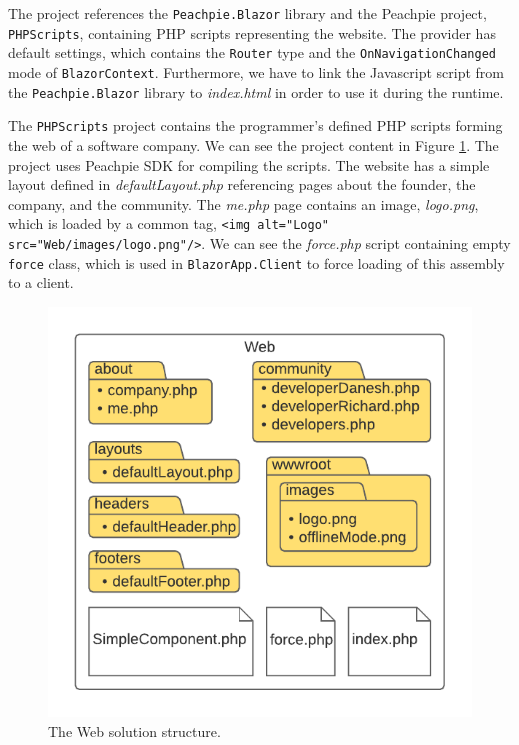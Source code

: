 \par
The project references the \texttt{Peachpie.Blazor} library and the Peachpie project, \texttt{PHPScripts}, containing PHP scripts representing the website.
The provider has default settings, which contains the \texttt{Router} type and the \texttt{OnNavigationChanged} mode of \texttt{BlazorContext}.
Furthermore, we have to link the Javascript script from the \texttt{Peachpie.Blazor} library to \textit{index.html} in order to use it during the runtime.
\par
The \texttt{PHPScripts} project contains the programmer's defined PHP scripts forming the web of a software company.
We can see the project content in Figure \ref{img22:web}.
The project uses Peachpie SDK for compiling the scripts.
The website has a simple layout defined in \textit{defaultLayout.php} referencing pages about the founder, the company, and the community.
The \textit{me.php} page contains an image, \textit{logo.png}, which is loaded by a common tag, \texttt{<img alt="Logo" src="Web/images/logo.png"/>}.
We can see the \textit{force.php} script containing empty \texttt{force} class, which is used in \texttt{BlazorApp.Client} to force loading of this assembly to a client.
\par
\begin{figure}
\centering
\includegraphics[scale=0.9]{./img/WebStructure}
\caption{The Web solution structure.}
\label{img22:web}
\end{figure} 
